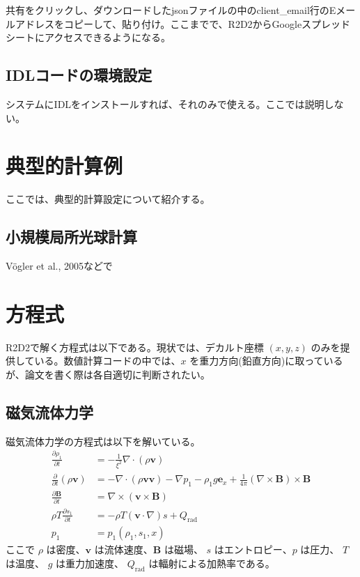 \documentclass[letterpaper,10pt,dvipdfmx,report]{sphinxmanual}
\begin{document}
共有をクリックし、ダウンロードしたjsonファイルの中のclient\_email行のEメールアドレスをコピーして、貼り付け。ここまでで、R2D2からGoogleスプレッドシートにアクセスできるようになる。


\section{IDLコードの環境設定}
\label{\detokenize{environment:idl}}
システムにIDLをインストールすれば、それのみで使える。ここでは説明しない。


\chapter{典型的計算例}
\label{\detokenize{typical_case:id1}}\label{\detokenize{typical_case::doc}}
ここでは、典型的計算設定について紹介する。


\section{小規模局所光球計算}
\label{\detokenize{typical_case:id2}}
Vögler et al., 2005などで


\chapter{方程式}
\label{\detokenize{equation:id1}}\label{\detokenize{equation::doc}}
R2D2で解く方程式は以下である。現状では、デカルト座標 \((x,y,z)\)  のみを提供している。数値計算コードの中では、\(x\) を重力方向(鉛直方向)に取っているが、論文を書く際は各自適切に判断されたい。


\section{磁気流体力学}
\label{\detokenize{equation:id2}}
磁気流体力学の方程式は以下を解いている。
\begin{equation*}
\begin{split}\frac{\partial \rho_1}{\partial t} &= - \frac{1}{\xi^2}\nabla\cdot
\left(\rho \boldsymbol{v}\right) \\
\frac{\partial}{\partial t}\left(\rho \boldsymbol{v}\right) &=
-\nabla\cdot\left(\rho\boldsymbol{vv}\right)
- \nabla p_1 - \rho_1 g\boldsymbol{e}_x
+\frac{1}{4\pi}\left(\nabla\times\boldsymbol{B}\right)
\times\boldsymbol{B} \\
\frac{\partial \boldsymbol{B}}{\partial t} &=
\nabla\times\left(\boldsymbol{v\times B}\right)
\\
\rho T \frac{\partial s_1}{\partial t} &= -\rho T
\left(\boldsymbol{v}\cdot\nabla\right) s + Q_\mathrm{rad} \\
p_1 &= p_1(\rho_1,s_1,x)\end{split}
\end{equation*}
ここで \(\rho\) は密度、\(\boldsymbol{v}\) は流体速度、\(\boldsymbol{B}\) は磁場、 \(s\) はエントロピー、\(p\) は圧力、 \(T\) は温度、 \(g\) は重力加速度、 \(Q_\mathrm{rad}\) は輻射による加熱率である。
\end{document}
